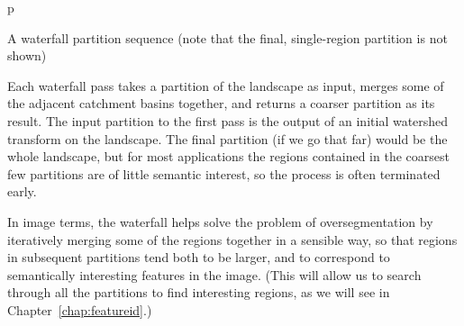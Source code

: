 \begin{stusubfig}{p}
	\hspace{4mm}%
	\hspace{4mm}%
\caption{A waterfall partition sequence (note that the final, single-region partition is not shown)}
\label{fig:segmentation-waterfall-partitionsequence}
\end{stusubfig}

Each waterfall pass takes a partition of the landscape as input, merges some of the adjacent catchment basins together, and returns a coarser partition as its result. The input partition to the first pass is the output of an initial watershed transform on the landscape. The final partition (if we go that far) would be the whole landscape, but for most applications the regions contained in the coarsest few partitions are of little semantic interest, so the process is often terminated early.

In image terms, the waterfall helps solve the problem of oversegmentation by iteratively merging some of the regions together in a sensible way, so that regions in subsequent partitions tend both to be larger, and to correspond to semantically interesting features in the image. (This will allow us to search through all the partitions to find interesting regions, as we will see in Chapter~\ref{chap:featureid}.)

